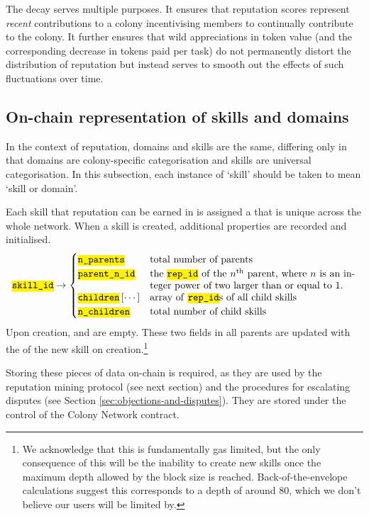 The decay serves multiple purposes. It ensures that reputation scores represent \emph{recent} contributions to a colony incentivising members to continually contribute to the colony. It further ensures that wild appreciations in token value (and the corresponding decrease in tokens paid per task) do not permanently distort the distribution of reputation but instead serves to smooth out the effects of such fluctuations over time.

\subsection{On-chain representation of skills and domains}\label{subsec:on-chain-representation-of-skills}
In the context of reputation, domains and skills are the same, differing only in that domains are colony-specific categorisation and skills are universal categorisation. In this subsection, each instance of `skill' should be taken to mean `skill or domain'.

Each skill that reputation can be earned in is assigned a  that is unique across the whole network. When a skill is created, additional properties are recorded and initialised.
\begin{equation*}
  \ascode{skill\_id} \rightarrow 
  \begin{cases}
    \ascode{n\_parents} &	\textnormal{total number of parents}\\
    \ascode{parent\_n\_id} &	\parbox[t]{.6\linewidth}{\textnormal{the \ascode{rep\_id} of the $n^{\rm th}$ parent, where $n$ is an integer power of two larger than or equal to 1. }}\\
    \ascode{children}\left[\cdots\right] &	\textnormal{array of \ascode{rep\_id}s of all child skills}\\
    \ascode{n\_children} &	\textnormal{total number of child skills}
  \end{cases}
\end{equation*}
Upon creation,  and  are empty. These two fields in all parents are updated with the  of the new skill on creation.\footnote{We acknowledge that this is fundamentally gas limited, but the only consequence of this will be the inability to create new skills once the maximum depth allowed by the block size is reached. Back-of-the-envelope calculations suggest this corresponds to a depth of around 80, which we don't believe our users will be limited by.}

Storing these pieces of data on-chain is required, as they are used by the reputation mining protocol (see next section) and the procedures for escalating disputes (see Section \ref{sec:objections-and-disputes}). They are stored under the control of the Colony Network contract.

